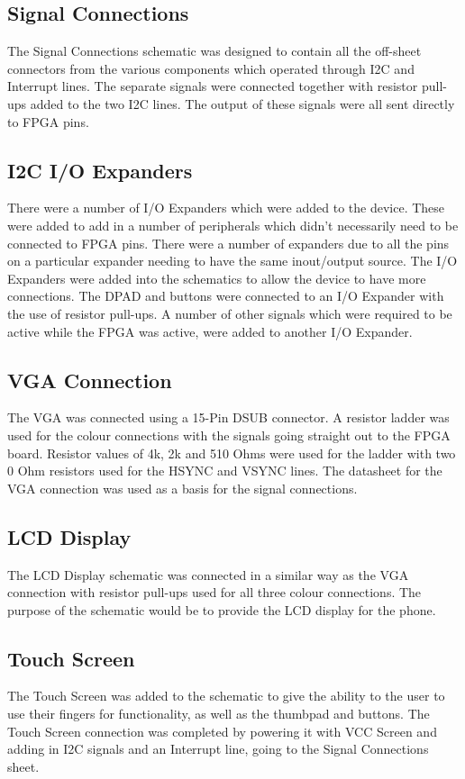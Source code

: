\subsection{Signal Connections}

	The Signal Connections schematic was designed to contain all the off-sheet connectors from the various components which operated through I2C and Interrupt lines. The separate signals were connected together with resistor pull-ups added to the two I2C lines. The output of these signals were all sent directly to FPGA pins. 

\subsection{I2C I/O Expanders}

	There were a number of I/O Expanders which were added to the device. These were added to add in a number of peripherals which didn't necessarily need to be connected to FPGA pins. There were a number of expanders due to all the pins on a particular expander needing to have the same inout/output source. 
The I/O Expanders were added into the schematics to allow the device to have more connections. The DPAD and buttons were connected to an I/O Expander with the use of resistor pull-ups. A number of other signals which were required to be active while the FPGA was active, were added to another I/O Expander.

\subsection{VGA Connection}
\label{chap:VGA}
	The VGA was connected using a 15-Pin DSUB connector. A resistor ladder was used for the colour connections with the signals going straight out to the FPGA board. Resistor values of 4k, 2k and 510 Ohms were used for the ladder with two 0 Ohm resistors used for the HSYNC and VSYNC lines. The datasheet for the VGA connection was used as a basis for the signal connections. 
 
\subsection{LCD Display}
\label{chap:LCD}
	The LCD Display schematic was connected in a similar way as the VGA connection with resistor pull-ups used for all three colour connections. The purpose of the schematic would be to provide the LCD display for the phone.

\subsection{Touch Screen}
\label{chap:touch}
	The Touch Screen was added to the schematic to give the ability to the user to use their fingers for functionality, as well as the thumbpad and buttons. 
The Touch Screen connection was completed by powering it with VCC Screen and adding in I2C signals and an Interrupt line, going to the Signal Connections sheet.

